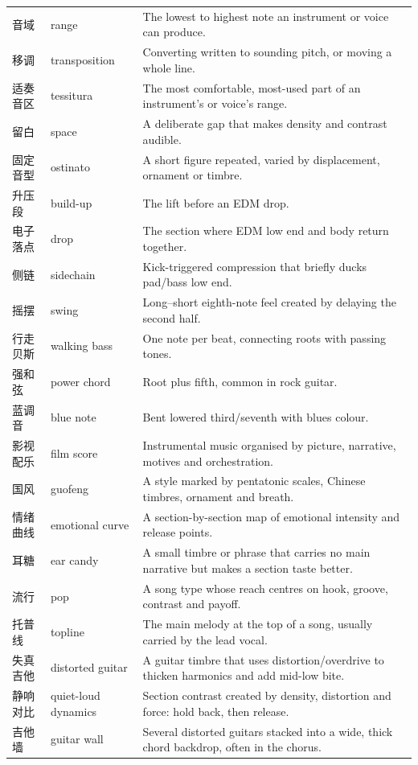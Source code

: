 \begin{longtable}{p{}p{}p{}}
音域 & range & The lowest to highest note an instrument or voice can produce. \\
移调 & transposition & Converting written to sounding pitch, or moving a whole line. \\
适奏音区 & tessitura & The most comfortable, most-used part of an instrument's or voice's range. \\
留白 & space & A deliberate gap that makes density and contrast audible. \\
固定音型 & ostinato & A short figure repeated, varied by displacement, ornament or timbre. \\
升压段 & build-up & The lift before an EDM drop. \\
电子落点 & drop & The section where EDM low end and body return together. \\
侧链 & sidechain & Kick-triggered compression that briefly ducks pad/bass low end. \\
摇摆 & swing & Long--short eighth-note feel created by delaying the second half. \\
行走贝斯 & walking bass & One note per beat, connecting roots with passing tones. \\
强和弦 & power chord & Root plus fifth, common in rock guitar. \\
蓝调音 & blue note & Bent lowered third/seventh with blues colour. \\
影视配乐 & film score & Instrumental music organised by picture, narrative, motives and orchestration. \\
国风 & guofeng & A style marked by pentatonic scales, Chinese timbres, ornament and breath. \\
情绪曲线 & emotional curve & A section-by-section map of emotional intensity and release points. \\
耳糖 & ear candy & A small timbre or phrase that carries no main narrative but makes a section taste better. \\
流行 & pop & A song type whose reach centres on hook, groove, contrast and payoff. \\
托普线 & topline & The main melody at the top of a song, usually carried by the lead vocal. \\
失真吉他 & distorted guitar & A guitar timbre that uses distortion/overdrive to thicken harmonics and add mid-low bite. \\
静响对比 & quiet-loud dynamics & Section contrast created by density, distortion and force: hold back, then release. \\
吉他墙 & guitar wall & Several distorted guitars stacked into a wide, thick chord backdrop, often in the chorus. \\

\end{longtable}
